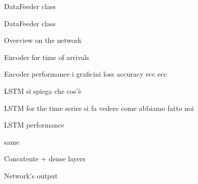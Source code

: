 \documentclass{beamer}
\begin{document}
\begin{frame}{DataFeeder class}

    
\end{frame}

\begin{frame}{DataFeeder class}

    
\end{frame}

\begin{frame}{Overview on the network}

    
\end{frame}

\begin{frame}{Encoder for time of arrivals}

    
\end{frame}
\begin{frame}{Encoder performance}
i graficini loss accuracy ecc ecc
    
\end{frame}

\begin{frame}{LSTM}
si spiega che cos'è
    
\end{frame}

\begin{frame}{LSTM for the time series}
si fa vedere come abbiamo fatto noi
    
\end{frame}

\begin{frame}{LSTM performance}

    same
\end{frame}

\begin{frame}{Concatente + dense layers}

    
\end{frame}

\begin{frame}{Network's output}

    
\end{frame}
\end{document}
